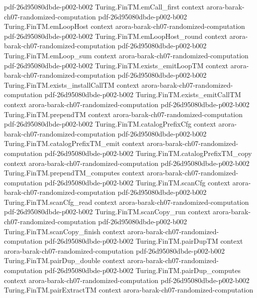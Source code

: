 \begin{theorem}
  {pdf-26d95080dbde-p002-b002}
\proofstep
  {Turing.FinTM.emCall_first}
  {context}
  {arora-barak-ch07-randomized-computation}
  {pdf-26d95080dbde-p002-b002}
\proofstep
  {Turing.FinTM.emLoopHost}
  {context}
  {arora-barak-ch07-randomized-computation}
  {pdf-26d95080dbde-p002-b002}
\proofstep
  {Turing.FinTM.emLoopHost_round}
  {context}
  {arora-barak-ch07-randomized-computation}
  {pdf-26d95080dbde-p002-b002}
\proofstep
  {Turing.FinTM.emLoop_sum}
  {context}
  {arora-barak-ch07-randomized-computation}
  {pdf-26d95080dbde-p002-b002}
\proofstep
  {Turing.FinTM.exists_emitLoopTM}
  {context}
  {arora-barak-ch07-randomized-computation}
  {pdf-26d95080dbde-p002-b002}
\proofstep
  {Turing.FinTM.exists_installCallTM}
  {context}
  {arora-barak-ch07-randomized-computation}
  {pdf-26d95080dbde-p002-b002}
\proofstep
  {Turing.FinTM.exists_emitCallTM}
  {context}
  {arora-barak-ch07-randomized-computation}
  {pdf-26d95080dbde-p002-b002}
\proofstep
  {Turing.FinTM.prependTM}
  {context}
  {arora-barak-ch07-randomized-computation}
  {pdf-26d95080dbde-p002-b002}
\proofstep
  {Turing.FinTM.catalogPrefixCfg}
  {context}
  {arora-barak-ch07-randomized-computation}
  {pdf-26d95080dbde-p002-b002}
\proofstep
  {Turing.FinTM.catalogPrefixTM_emit}
  {context}
  {arora-barak-ch07-randomized-computation}
  {pdf-26d95080dbde-p002-b002}
\proofstep
  {Turing.FinTM.catalogPrefixTM_copy}
  {context}
  {arora-barak-ch07-randomized-computation}
  {pdf-26d95080dbde-p002-b002}
\proofstep
  {Turing.FinTM.prependTM_computes}
  {context}
  {arora-barak-ch07-randomized-computation}
  {pdf-26d95080dbde-p002-b002}
\proofstep
  {Turing.FinTM.scanCfg}
  {context}
  {arora-barak-ch07-randomized-computation}
  {pdf-26d95080dbde-p002-b002}
\proofstep
  {Turing.FinTM.scanCfg_read}
  {context}
  {arora-barak-ch07-randomized-computation}
  {pdf-26d95080dbde-p002-b002}
\proofstep
  {Turing.FinTM.scanCopy_run}
  {context}
  {arora-barak-ch07-randomized-computation}
  {pdf-26d95080dbde-p002-b002}
\proofstep
  {Turing.FinTM.scanCopy_finish}
  {context}
  {arora-barak-ch07-randomized-computation}
  {pdf-26d95080dbde-p002-b002}
\proofstep
  {Turing.FinTM.pairDupTM}
  {context}
  {arora-barak-ch07-randomized-computation}
  {pdf-26d95080dbde-p002-b002}
\proofstep
  {Turing.FinTM.pairDup_double}
  {context}
  {arora-barak-ch07-randomized-computation}
  {pdf-26d95080dbde-p002-b002}
\proofstep
  {Turing.FinTM.pairDup_computes}
  {context}
  {arora-barak-ch07-randomized-computation}
  {pdf-26d95080dbde-p002-b002}
\proofstep
  {Turing.FinTM.pairExtractTM}
  {context}
  {arora-barak-ch07-randomized-computation}

\end{theorem}
